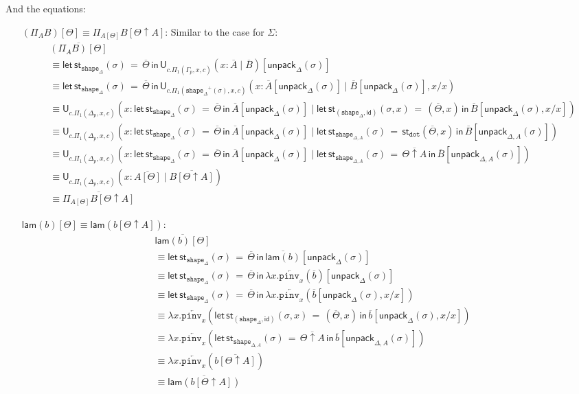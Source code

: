 \documentclass[10pt]{article}
\theoremstyle{definition}
\newcommand{\id}{\mathsf{id}}
\newcommand{\rewrite}[2]{\overleftarrow{#1}(#2)}
\newcommand\U[3]{\ensuremath{\mathsf{U}_{#1}(#2 \mid #3)}}
\newcommand\UI[2]{\ensuremath{\lambda #1.#2}}
\newcommand\StI[2]{\ensuremath{\mathsf{st}_{#1}(#2)}}
\newcommand\StE[4]{\ensuremath{\mathsf{let} \, \StI{#1}{#3} \, = \, {#2} \, \mathsf{in} \, #4}}
\newcommand\TrPlus[2]{\ensuremath{{#1}^+(#2)}}
\newcommand\unpack[2]{\ensuremath{\mathsf{unpack}_{#1}(#2)}}
\newcommand{\modeof}[1]{{#1}_p}
\newcommand{\tdot}{\ensuremath{\mathtt{dot}}}
\newcommand{\tshape}[1]{\ensuremath{\mathtt{shape}_{#1}}}
\newcommand{\upstairs}[1]{\overline{#1}}
\newcommand\pinv[1]{\ensuremath{\mathtt{pinv}_{#1}}}
\newcommand\qlam[1]{\ensuremath{\mathsf{lam}({#1})}}
\begin{document}
And the equations:
\begin{enumerate}[style = multiline, labelwidth = 80pt]
\item[{$(\Pi_A B)[\Theta] \equiv \Pi_{A[\Theta]} B[\Theta \uparrow A]$}:] Similar to the case for $\Sigma$:
\begin{align*}
&\upstairs{(\Pi_A B)[\Theta]} \\
&\equiv \StE{\tshape{\Delta}}{\upstairs{\Theta}}{\sigma}{\U{c. \Pi_1(\modeof{\Gamma},x,c)}{x : \upstairs{A}}{\upstairs{B}}[\unpack{\Delta}{\sigma}]} \\
&\equiv \StE{\tshape{\Delta}}{\upstairs{\Theta}}{\sigma}{\U{c. \Pi_1(\TrPlus{\tshape{\Delta}}{\sigma},x,c)}{x : \upstairs{A}[\unpack{\Delta}{\sigma}]}{\upstairs{B}[\unpack{\Delta}{\sigma}], x/x}} \\
&\equiv \U{c. \Pi_1(\modeof{\Delta},x,c)}{x : \StE{\tshape{\Delta}}{\upstairs{\Theta}}{\sigma}{\upstairs{A}[\unpack{\Delta}{\sigma}]}}{\StE{(\tshape{\Delta}, \id)}{(\upstairs{\Theta}, x)}{\sigma, x}{\upstairs{B}[\unpack{\Delta}{\sigma}, x/x]}} \\
&\equiv \U{c. \Pi_1(\modeof{\Delta},x,c)}{x : \StE{\tshape{\Delta}}{\upstairs{\Theta}}{\sigma}{\upstairs{A}[\unpack{\Delta}{\sigma}]}}{\StE{\tshape{\Delta,A}}{\StI{\tdot}{\upstairs{\Theta}, x}}{\sigma}{\upstairs{B}[\unpack{\Delta, A}{\sigma}]}} \\
&\equiv \U{c. \Pi_1(\modeof{\Delta},x,c)}{x : \StE{\tshape{\Delta}}{\upstairs{\Theta}}{\sigma}{\upstairs{A}[\unpack{\Delta}{\sigma}]}}{\StE{\tshape{\Delta,A}}{\upstairs{\Theta \uparrow A}}{\sigma}{\upstairs{B}[\unpack{\Delta, A}{\sigma}]}} \\
&\equiv \U{c. \Pi_1(\modeof{\Delta},x,c)}{x : \upstairs{A[\Theta]}}{\upstairs{B[\Theta \uparrow A]}} \\
&\equiv \upstairs{\Pi_{A[\Theta]} B[\Theta \uparrow A]}
\end{align*}

\item[{$\qlam{b}[\Theta] \equiv \qlam{b[\Theta \uparrow A]}$}:]
\begin{align*}
&\upstairs{\qlam{b}[\Theta]} \\
&\equiv \StE{\tshape{\Delta}}{\upstairs{\Theta}}{\sigma}{\upstairs{\qlam{b}}[\unpack{\Delta}{\sigma}]} \\
&\equiv \StE{\tshape{\Delta}}{\upstairs{\Theta}}{\sigma}{\UI{x}{\rewrite{\pinv{x}}{\upstairs{b}}}[\unpack{\Delta}{\sigma}]} \\
&\equiv \StE{\tshape{\Delta}}{\upstairs{\Theta}}{\sigma}{\UI{x}{\rewrite{\pinv{x}}{\upstairs{b}[\unpack{\Delta}{\sigma}, x/x]}}} \\
&\equiv \UI{x}{\rewrite{\pinv{x}}{\StE{(\tshape{\Delta}, \id)}{(\upstairs{\Theta}, x)}{\sigma, x}{\upstairs{b}[\unpack{\Delta}{\sigma}, x/x]}}} \\
&\equiv \UI{x}{\rewrite{\pinv{x}}{\StE{\tshape{\Delta, A}}{\upstairs{\Theta \uparrow A}}{\sigma}{\upstairs{b}[\unpack{\Delta,A}{\sigma}]}}} \\
&\equiv \UI{x}{\rewrite{\pinv{x}}{\upstairs{b[\Theta \uparrow A]}}} \\
&\equiv \upstairs{\qlam{b[\Theta \uparrow A]}}
\end{align*}


\end{enumerate}
\end{document}
